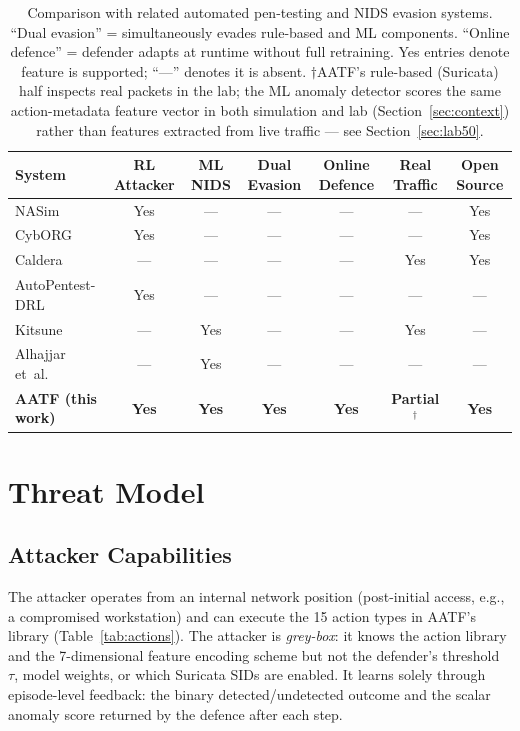 \documentclass[sigconf]{acmart}
\begin{document}
\begin{table}[t]
\caption{Comparison with related automated pen-testing and NIDS evasion systems.
``Dual evasion'' = simultaneously evades rule-based and ML components.
``Online defence'' = defender adapts at runtime without full retraining.
Yes entries denote feature is supported; ``---'' denotes it is absent.
$\dagger$AATF's rule-based (Suricata) half inspects real packets in the
lab; the ML anomaly detector scores the same action-metadata feature
vector in both simulation and lab (Section~\ref{sec:context}) rather
than features extracted from live traffic --- see Section~\ref{sec:lab50}.}
\label{tab:related}
\centering
\small
\begin{tabular}{L{2.8cm} c c c c c c}
\toprule
System & RL Attacker & ML NIDS & Dual Evasion & Online Defence & Real Traffic & Open Source \\
\midrule
NASim~\cite{schwartz2020nasim}                   & Yes & ---  & ---  & ---  & ---  & Yes \\
CybORG~\cite{standen2021cyborg}                  & Yes & ---  & ---  & ---  & ---  & Yes \\
Caldera~\cite{applebaum2016intelligent}          & --- & ---  & ---  & ---  & Yes  & Yes \\
AutoPentest-DRL~\cite{chaudhary2022autopentest}  & Yes & ---  & ---  & ---  & ---  & --- \\
Kitsune~\cite{mirsky2018kitsune}                 & --- & Yes  & ---  & ---  & Yes  & --- \\
Alhajjar et~al.~\cite{alhajjar2021adversarial}   & --- & Yes  & ---  & ---  & ---  & --- \\
\midrule
\textbf{AATF (this work)} & \textbf{Yes} & \textbf{Yes} & \textbf{Yes} & \textbf{Yes} & \textbf{Partial$^\dagger$} & \textbf{Yes} \\
\bottomrule
\end{tabular}
\end{table}

\section{Threat Model}
\label{sec:threat}

\subsection{Attacker Capabilities}

The attacker operates from an internal network position (post-initial
access, e.g., a compromised workstation) and can execute the 15 action
types in AATF's library (Table~\ref{tab:actions}). The attacker is
\emph{grey-box}: it knows the action library and the 7-dimensional
feature encoding scheme but not the defender's threshold~$\tau$,
model weights, or which Suricata SIDs are enabled. It learns solely
through episode-level feedback: the binary detected/undetected outcome
and the scalar anomaly score returned by the defence after each step.
\end{document}
